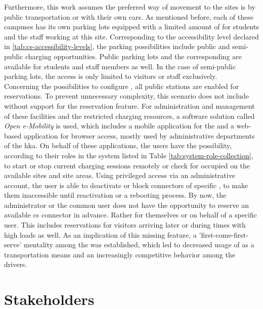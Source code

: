 \noindent Furthermore, this work assumes the preferred way of movement to the sites is by public transportation or with their own cars.
As mentioned before, each of these campuses has its own parking lots equipped with a limited amount of  for students and the staff working at this site. Corresponding to the accessibility level declared in \ref{tab:cs-accessibility-levels}, the parking possibilities include public and semi-public charging opportunities.
Public parking lots and the corresponding  are available for students and staff members as well. In the case of semi-public parking lots, the access is only limited to visitors or staff exclusively. \\
Concerning the possibilities to configure , all public stations are enabled for reservations. To prevent unnecessary complexity, this scenario does not include  without support for the reservation feature.
For administration and management of these facilities and the restricted charging resources, a software solution called \textit{Open e-Mobility} \cite{noauthor_github_nodate,noauthor_github_nodate-1,noauthor_github_nodate-3} is used, which includes a mobile application for the  and a web-based application for browser access, mostly used by administrative departments of the \acrshort{hka}. 
On behalf of these applications, the users have the possibility, according to their roles in the system listed in Table \ref{tab:system-role-collection}, to start or stop current charging sessions remotely or check for occupied  on the available sites and site areas.
Using privileged access via an administrative account, the user is able to deactivate or block connectors of specific , to make them inaccessible until reactivation or a rebooting process.
By now, the administrator or the common user does not have the opportunity to reserve an available \acrshort{cs} connector in advance. Rather for themselves or on behalf of a specific user. This includes reservations for visitors arriving later or during times with high loads as well.
As an implication of this missing feature, a 'first-come-first-serve' mentality among the  was established, which led to decreased usage of  as a transportation means and an increasingly competitive behavior among the drivers.

\section{Stakeholders}
\label{ch:Requirements Engineering:sec:Stakeholders}

